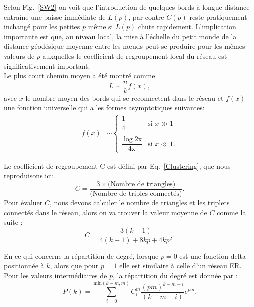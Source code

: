  
 Selon Fig.~\ref{SW2} on voit que l'introduction de quelques bords à longue distance entraîne une baisse immédiate de $L(p)$, par contre $C(p)$ reste pratiquement inchangé pour les petites $p$ même si $L(p)$ chute rapidement. L'implication importante est que, au niveau local, la mise à l'échelle du petit monde de la distance géodésique moyenne entre les nœuds peut se produire pour les mêmes valeurs de $p$ auxquelles le coefficient de regroupement local du réseau est significativement important.\\
 Le plus court chemin moyen a été montré comme \cite{Barthelemy-Amaral1999,Newman-al2000}
 \begin{equation}
 L\sim \frac{n}{k}f(x),
 \end{equation}
 avec $x$ le nombre moyen des bords qui se reconnectent dans le réseau et $f(x)$  une fonction universelle qui a les formes asymptotiques suivantes:
 \begin{align}
 f(x)&\sim
 \begin{cases}
 \dfrac{1}{4} & \text{si } x \gg1\\
 \\
 \dfrac{\log\mathrm{2x}}{\mathrm{4x}}& \text{si } x \ll1.
 \end{cases}
 \end{align}
 
 Le coefficient de regroupement C est défini par Eq.~\eqref{Clustering}, que nous reproduisons ici:
 \begin{equation}
 C=\frac{3\times\text{(Nombre de triangles)}}{\text{(Nombre de triples connectés)}}.
 \end{equation}  
 Pour évaluer $C$, nous devons calculer le nombre de triangles et les triplets connectés dans le réseau, alors on va trouver la valeur moyenne de $C$ comme la suite \cite{Newman2010-558}:
 \begin{equation}
 C=\frac{3(k-1)}{4(k-1)+8kp+4kp^2}.
 \end{equation}  
 
 En ce qui concerne la répartition de degré, lorsque $p=0$ est une fonction delta positionnée à $k$, alors que pour $p=1$ elle est similaire à celle d'un réseau ER. Pour les valeurs intermédiaires de $p$, la répartition du degré est donnée par \cite{Barrat-Weigt2000}:
 \begin{equation}
 P(k)=\sum_{i=0}^{\text{min}(k-m,m)}C_i^m\frac{(pm)^{k-m-i}}{(k-m-i)}e^{pm}.
 \end{equation} 
 
